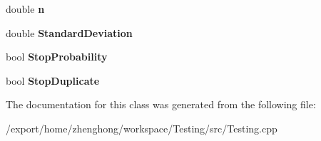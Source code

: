 \begin{DoxyCompactItemize}
\item 
\hypertarget{classcalculation_ac08355d40a68fce6ae7d3ef68c404ea0}{double {\bfseries n}}\label{classcalculation_ac08355d40a68fce6ae7d3ef68c404ea0}

\item 
\hypertarget{classcalculation_a2dfab66d0b704e90a99242afae50e5d9}{double {\bfseries Standard\+Deviation}}\label{classcalculation_a2dfab66d0b704e90a99242afae50e5d9}

\item 
\hypertarget{classcalculation_afe5986ea96fc71181e2b8644d7dd68ff}{bool {\bfseries Stop\+Probability}}\label{classcalculation_afe5986ea96fc71181e2b8644d7dd68ff}

\item 
\hypertarget{classcalculation_a296c559e111a99782aa343f0c51e0437}{bool {\bfseries Stop\+Duplicate}}\label{classcalculation_a296c559e111a99782aa343f0c51e0437}

\end{DoxyCompactItemize}


The documentation for this class was generated from the following file\+:\begin{DoxyCompactItemize}
\item 
/export/home/zhenghong/workspace/\+Testing/src/Testing.\+cpp\end{DoxyCompactItemize}
